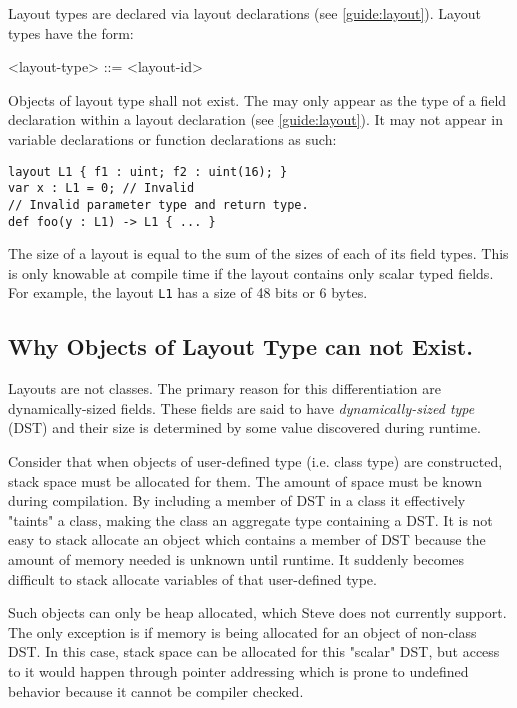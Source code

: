 Layout types are declared via layout declarations (see \ref{guide:layout}). Layout types have the form:

\begin{minip}
\begin{grammar}
<layout-type> ::= <layout-id>
\end{grammar}
\end{minip}

Objects of layout type shall not exist. The  may only appear as the type of a field declaration within a layout declaration (see \ref{guide:layout}). It may not appear in variable declarations or function declarations as such:

\begin{minip}
\begin{lstlisting}
layout L1 { f1 : uint; f2 : uint(16); }
var x : L1 = 0; // Invalid
// Invalid parameter type and return type.
def foo(y : L1) -> L1 { ... }
\end{lstlisting}
\end{minip}

The size of a layout is equal to the sum of the sizes of each of its field types. This is only knowable at compile time if the layout contains only scalar typed fields. For example, the layout \texttt{L1} has a size of 48 bits or 6 bytes.

\subsection{Why Objects of Layout Type can not Exist.} \label{guide:no_dst}

Layouts are not classes. The primary reason for this differentiation are dynamically-sized fields. These fields are said to have \textit{dynamically-sized type} (DST) and their size is determined by some value
discovered during runtime.

Consider that when objects of user-defined type (i.e. class type) are constructed, stack space must be allocated for them. The amount of space must be known during compilation. By including a member of DST in a class it effectively "taints" a class, making the class an aggregate type containing a DST. It is not easy to stack allocate an object which contains a member of DST because the amount of memory needed is unknown until runtime. It suddenly becomes difficult to stack allocate variables of that user-defined type. 

Such objects can only be heap allocated, which Steve does not currently support. The only exception is if memory is being allocated for an object of non-class DST. In this case, stack space can be allocated for this "scalar" DST, but access to it would happen through pointer addressing which is prone to undefined behavior because it cannot be compiler checked.


